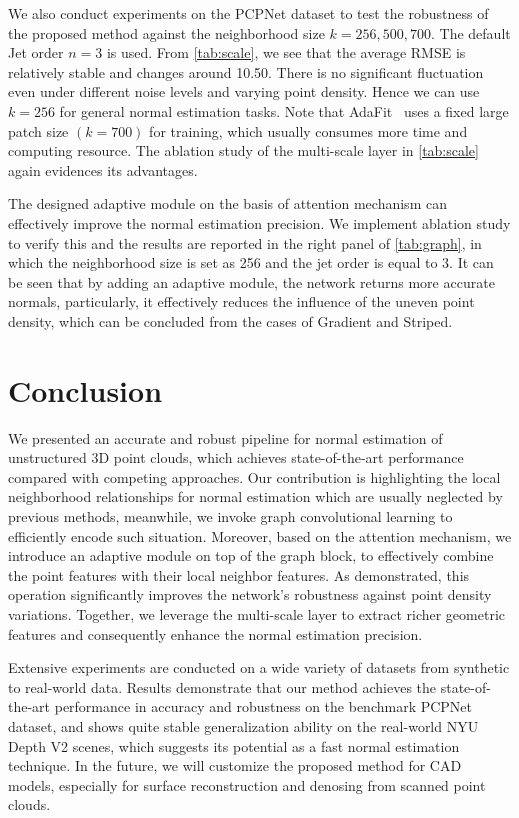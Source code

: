 \documentclass[runningheads]{llncs}
\begin{document}
We also conduct experiments on the PCPNet dataset to test the robustness of the proposed method against the neighborhood size $k = 256, 500, 700$. The default Jet order $n=3$ is used. From \cref{tab:scale}, we see that the average RMSE is relatively stable and changes around 10.50. There is no significant fluctuation even under different noise levels and varying point density. Hence we can use $k = 256$ for general normal estimation tasks. Note that AdaFit~\cite{zhu2021adafit} uses a fixed large patch size $\left(k = 700\right)$ for training, which usually consumes more time and computing resource. The ablation study of  the multi-scale layer in \cref{tab:scale} again evidences its advantages. 

 The designed adaptive module on the basis of attention mechanism can effectively improve the normal estimation precision. We implement ablation study to verify this and the results are reported in the right panel of  \cref{tab:graph}, in which the neighborhood size is set as 256 and the jet order is equal to 3. It can be seen that by adding an adaptive module, the network returns more accurate normals, particularly, it effectively reduces the influence of the uneven point density, which can be concluded from the cases of Gradient and Striped.

\section{Conclusion}
\label{sec:conclu}
We presented an accurate and robust pipeline for normal estimation of unstructured 3D point clouds, which achieves state-of-the-art performance compared with competing approaches. Our contribution is highlighting the local neighborhood relationships for normal estimation which are usually neglected by previous methods, meanwhile, we invoke graph convolutional learning to efficiently encode such situation. Moreover, based on the attention mechanism, we introduce an adaptive module on top of the graph block, to effectively combine the point features with their local neighbor features. As demonstrated, this operation significantly improves the network's robustness against point density variations. Together, we leverage the multi-scale layer to extract richer geometric features and consequently enhance the normal estimation precision. 


Extensive experiments are conducted on a wide variety of datasets from synthetic to real-world data. Results demonstrate that our method achieves the state-of-the-art performance in accuracy and robustness on the benchmark PCPNet dataset, and shows quite stable generalization ability on the real-world NYU Depth V2 scenes, which suggests its potential as a fast normal estimation technique. In the future, we will customize the proposed method for CAD models, especially for surface reconstruction and denosing from scanned point clouds. 
\end{document}
